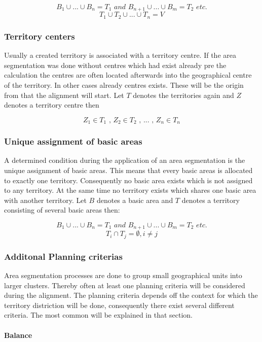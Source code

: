 \[ \mathit{B_{1} \cup  ... \cup B_{n}=T_{1} \text{ and } B_{n+1} \cup ... \cup B_{m}=T_{2} \text{ etc.}}\]
\[ \mathit{T_{1} \cup  T_{2} \cup ... \cup T_{n}=V}\]

\subsubsection{Territory centers}
Usually a created territory is associated with a territory centre. If the area segmentation was done without centres which had exist already pre the 
calculation the centres are often located afterwards into the geographical centre of the territory. In other cases already centres exists. These will be the origin from that the alignment will start. Let $ T $ denotes the territories again and $ Z $ denotes a territory centre then

\[ \mathit{Z_{1} \in T_{1} \text{ , } Z_{2} \in T_{2} \text{ , } ... \text{ , } Z_{n} \in T_{n}}\]

\subsubsection{Unique assignment of basic areas}
A determined condition during the application of an area segmentation is the unique assignment of basic areas. This means that every basic areas is allocated to exactly one territory. Consequently no basic area exists which is not assigned to any territory. At the same time no territory exists which shares one basic area with another territory. Let $ B $ denotes a basic area and $ T $ denotes a territory consisting of several basic areas then:

\[ \mathit{B_{1} \cup  ... \cup B_{n}=T_{1} \text{ and } B_{n+1} \cup ... \cup B_{m}=T_{2} \text{ etc.} }\]
\[ \mathit{ T_{i} \cap T_{j}  =\emptyset, i \neq j}\]


\subsubsection{Additonal Planning criterias}\label{criterias}
Area segmentation processes are done to group small geographical units into larger clusters. Thereby often at least one planning criteria will be considered during the alignment. The planning criteria depends off the context for which the territory distriction will be done, consequently there exist several different criteria. The most common will be explained in that section.

\paragraph{Balance}\mbox{} \\

